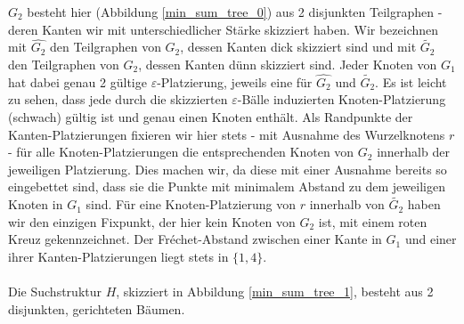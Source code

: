 \documentclass[a4paper, 12pt, twoside]{article}
\theoremstyle{Format1} %
\begin{document}
$G_2$ besteht hier (Abbildung \ref{min_sum_tree_0}) aus 2 disjunkten Teilgraphen - deren Kanten wir mit unterschiedlicher Stärke skizziert haben.
Wir bezeichnen mit $\widehat{G_2}$ den Teilgraphen von $G_2$, dessen Kanten dick skizziert sind und mit $\widetilde{G_2}$ den Teilgraphen von $G_2$, dessen Kanten dünn skizziert sind.
Jeder Knoten von $G_1$ hat dabei genau 2 gültige $\varepsilon$-Platzierung, jeweils eine für $\widehat{G_2}$ und $\widetilde{G_2}$.
Es ist leicht zu sehen, dass jede durch die skizzierten $\varepsilon$-Bälle induzierten Knoten-Platzierung (schwach) gültig ist und genau einen Knoten enthält.
Als Randpunkte der Kanten-Platzierungen fixieren wir hier stets - mit Ausnahme des Wurzelknotens $r$ - für alle Knoten-Platzierungen die entsprechenden Knoten von $G_2$ innerhalb der jeweiligen Platzierung.
Dies machen wir, da diese mit einer Ausnahme bereits so eingebettet sind, dass sie die Punkte mit minimalem Abstand zu dem jeweiligen Knoten in $G_1$ sind.
Für eine Knoten-Platzierung von $r$ innerhalb von $\widetilde{G_2}$
haben wir den einzigen Fixpunkt, der hier kein Knoten von $G_2$ ist, mit einem roten Kreuz gekennzeichnet.
Der Fréchet-Abstand zwischen einer Kante in $G_1$ und einer ihrer Kanten-Platzierungen liegt stets in $\{1,4\}$.
\\
\\
Die Suchstruktur $H$, skizziert in Abbildung \ref{min_sum_tree_1}, besteht aus 2 disjunkten, gerichteten Bäumen.
\end{document}

